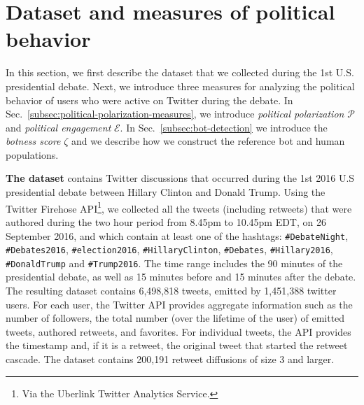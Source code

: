
\section{Dataset and measures of political behavior}
\label{sec:four-measures}

In this section, we first describe the \debate dataset that we collected during the 1st U.S. presidential debate.
Next, we introduce three measures for analyzing the political behavior of users who were active on Twitter during the debate.
In Sec.~\ref{subsec:political-polarization-measures}, we introduce \emph{political polarization} $\mathcal{P}$ and \emph{political engagement} $\mathcal{E}$.
In Sec.~\ref{subsec:bot-detection} we introduce the \emph{botness score} $\zeta$ and we describe how we construct the reference bot and human populations.


\textbf{The \debate dataset}
contains Twitter discussions that occurred during the 1st 2016 U.S presidential debate between Hillary Clinton and Donald Trump.
Using the Twitter Firehose API\footnote{Via the Uberlink Twitter Analytics Service.}, we collected all the tweets (including retweets) that were authored during the two hour period from 8.45pm to 10.45pm EDT, on 26 September 2016, and which contain at least one of the hashtags: \texttt{\#DebateNight}, \texttt{\#Debates2016}, \texttt{\#election2016}, \texttt{\#HillaryClinton}, \texttt{\#Debates}, \texttt{\#Hillary2016}, \texttt{\#DonaldTrump} and \texttt{\#Trump2016}.
The time range includes the 90 minutes of the presidential debate, as well as 15 minutes before and 15 minutes after the debate.
The resulting dataset contains 6,498,818 tweets, emitted by 1,451,388 twitter users.
For each user, the Twitter API provides aggregate information such as the number of followers, the total number (over the lifetime of the user) of emitted tweets, authored retweets, and favorites.
For individual tweets, the API provides the timestamp and, if it is a retweet, the original tweet that started the retweet cascade.
The \debate dataset contains 200,191 retweet diffusions of size 3 and larger.

